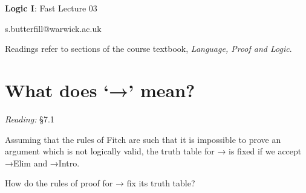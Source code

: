 \documentclass[12pt]{extarticle}
\date{}
\makeatletter
\def \ititle {Origins of Mind}
\def \isubtitle {Lecture 08}
\def \iemail{s.butterfill@warwick.ac.uk}
\makeatother
\begin{document}

\begin{multicols*}{3}

\setlength\footnotesep{1em}







\def \ititle {Logic I}
 
\def \isubtitle {Fast Lecture 03}
 
\begin{center}
 
{\Large
 
\textbf{\ititle}: \isubtitle
 
}
 
 
 
\iemail %
 
\end{center}
 
Readings refer to sections of the course textbook, \emph{Language, Proof and Logic}.
 
 
 
\section{What does ‘→’ mean?}
 
\emph{Reading:} §7.1
 
Assuming that the rules of Fitch are such that it is impossible to prove an argument which is not logically valid, the truth table for → is fixed if we accept →Elim and →Intro.
 
How do the rules of proof for → fix its truth table?
 

\end{multicols*}
\end{document}
